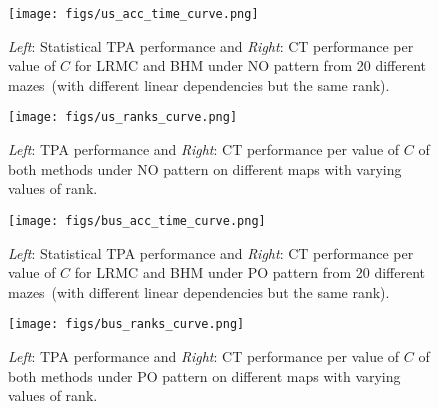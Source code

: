 
\begin{figure} 
  \centering
  	{\label{fig:us_acc_time_curve}\texttt{[image: figs/us\_acc\_time\_curve.png]}}
  \caption{\small \textit{Left}: Statistical TPA performance and \textit{Right}: CT performance per value of $C$ for LRMC and BHM under NO pattern from 20 different mazes~(with different linear dependencies but the same rank). 
  } \vspace{-10pt}
\label{fig:us_acc_time_curve}  
\end{figure}

\begin{figure}%
  \centering
  	{\label{fig:us_ranks_curve}\texttt{[image: figs/us\_ranks\_curve.png]}}
  \caption{\small \textit{Left}: TPA performance and \textit{Right}: CT performance per value of $C$ of both methods under NO pattern on different maps with varying values of rank.
  } \vspace{-10pt}
\label{fig:us_ranks_curve}  
\end{figure}


\begin{figure}%
  \centering
  	{\label{fig:bus_acc_time_curve}\texttt{[image: figs/bus\_acc\_time\_curve.png]}}
  \caption{\small \textit{Left}: Statistical TPA performance and \textit{Right}: CT performance per value of $C$ for LRMC and BHM under PO pattern from 20 different mazes~(with different linear dependencies but the same rank).  
  } \vspace{-10pt}
\label{fig:bus_acc_time_curve}  
\end{figure}

\begin{figure}%
  \centering
  	{\label{fig:bus_ranks_curve}\texttt{[image: figs/bus\_ranks\_curve.png]}}
  \caption{\small \textit{Left}: TPA performance and \textit{Right}: CT performance per value of $C$ of both methods under PO pattern on different maps with varying values of rank.
  } \vspace{-10pt}
\label{fig:bus_ranks_curve}  
\end{figure}



